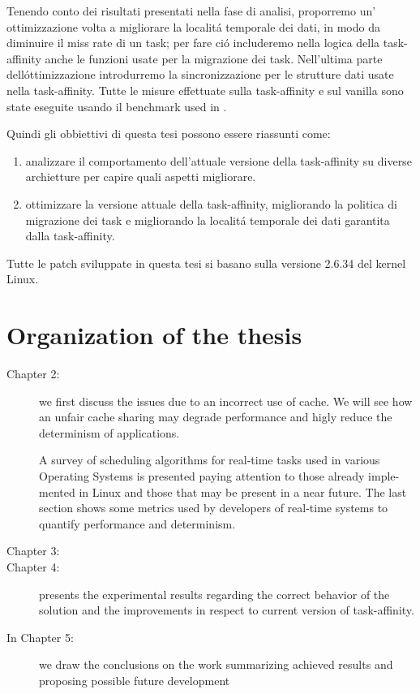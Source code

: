Tenendo conto dei risultati presentati nella fase di analisi, proporremo un' ottimizzazione volta a migliorare la localit\'a temporale dei dati, in modo da
diminuire il miss rate di un task; per fare ci\'o includeremo nella logica della task-affinity anche le funzioni usate per la migrazione dei task. 
Nell'ultima parte dell\'ottimizzazione introdurremo la sincronizzazione per le strutture dati usate nella task-affinity. Tutte le misure effettuate sulla 
task-affinity e sul vanilla sono state eseguite usando il benchmark used in \cite{lcs}.

Quindi gli obbiettivi di questa tesi possono essere riassunti come:

\begin{enumerate}
\item analizzare il comportamento dell'attuale versione della task-affinity su diverse archietture per capire quali aspetti migliorare.
\item ottimizzare la versione attuale della task-affinity, migliorando la politica di migrazione dei task e migliorando la localit\'a temporale dei dati 
garantita dalla task-affinity.
\end{enumerate}

Tutte le patch sviluppate in questa tesi si basano sulla versione 2.6.34 del kernel Linux. 

\section{Organization of the thesis}
\label{sec:OrganizationThesis}

\begin{description}

\item [Chapter 2:] we first discuss the issues due to an incorrect use of cache. We will see how an unfair cache sharing may degrade performance and 
higly reduce the determinism of applications.

A survey of scheduling algorithms for real-time tasks used in various
Operating Systems is presented paying attention to those already imple-
mented in Linux and those that may be present in a near future. The
last section shows some metrics used by developers of real-time systems
to quantify performance and determinism.
 

\item [Chapter 3:]

\item [Chapter 4:] presents the experimental results regarding the correct behavior of the solution and the improvements in respect to current version of
task-affinity.

\item [In Chapter 5:] we draw the conclusions on the work summarizing achieved results and proposing possible future development

\end{description}
